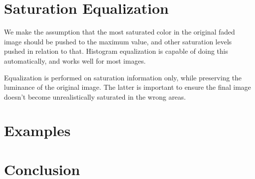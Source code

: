 \documentclass{article}
\begin{document}
\section{Saturation Equalization}
We make the assumption that the most saturated color in the original faded
image should be pushed to the maximum value, and other saturation levels
pushed in relation to that. Histogram equalization is capable of doing this 
automatically, and works well for most images.

Equalization is performed on saturation information only, while
preserving the luminance of the original image. The latter is important to
ensure the final image doesn't become unrealistically saturated in the wrong areas.

\section{Examples}

\section{Conclusion}
\end{document}

